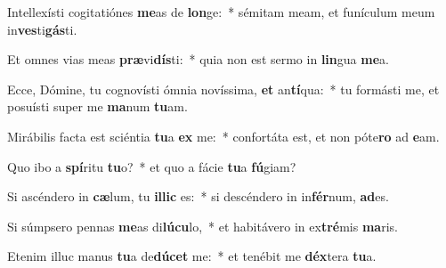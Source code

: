 \item Intellexísti cogitatiónes \textbf{me}as de \textbf{lon}ge:~* sémitam meam, et funículum meum in\textbf{ves}ti\textbf{gás}ti.
\item Et omnes vias meas \textbf{præ}vi\textbf{dís}ti:~* quia non est sermo in \textbf{lin}gua \textbf{me}a.
\item Ecce, Dómine, tu cognovísti ómnia novíssima, \textbf{et} an\textbf{tí}qua:~* tu formásti me, et posuísti super me \textbf{ma}num \textbf{tu}am.
\item Mirábilis facta est sciéntia \textbf{tu}a \textbf{ex} me:~* confortáta est, et non póte\textbf{ro} ad \textbf{e}am.
\item Quo ibo a \textbf{spí}ritu \textbf{tu}o?~* et quo a fácie \textbf{tu}a \textbf{fú}giam?
\item Si ascéndero in \textbf{cæ}lum, tu \textbf{il}\textbf{lic} es:~* si descéndero in in\textbf{fér}num, \textbf{ad}es.
\item Si súmpsero pennas \textbf{me}as di\textbf{lú}\textbf{cu}lo,~* et habitávero in ex\textbf{tré}mis \textbf{ma}ris.
\item Etenim illuc manus \textbf{tu}a de\textbf{dú}\textbf{cet} me:~* et tenébit me \textbf{déx}tera \textbf{tu}a.

